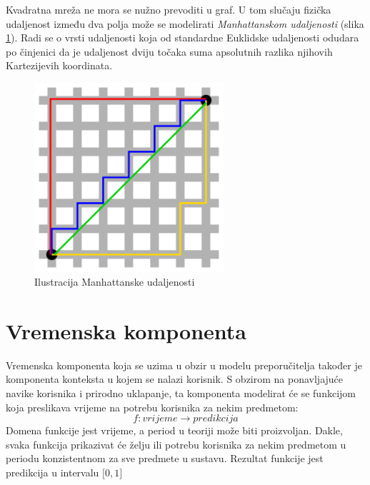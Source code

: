 \documentclass[times, utf8, diplomski, numeric]{fer}
\begin{document}
Kvadratna mreža ne mora se nužno prevoditi u graf. U tom slučaju fizička
udaljenost između dva polja može se modelirati \emph{Manhattanskom udaljenosti}
(slika \ref{fig:ManhattanDistance}). Radi se o vrsti udaljenosti koja od
standardne Euklidske udaljenosti odudara po činjenici da je udaljenost dviju
točaka suma apsolutnih razlika njihovih Kartezijevih koordinata.

 \begin{figure}[H]
	\centering
	\includegraphics[width=7cm]{images/Manhattan_distance.png}
	\caption{Ilustracija Manhattanske udaljenosti}
	\label{fig:ManhattanDistance}
\end{figure}

\section{Vremenska komponenta}
Vremenska komponenta koja se uzima u obzir u modelu preporučitelja također je
komponenta konteksta u kojem se nalazi korisnik. S obzirom na ponavljajuće
navike korisnika i prirodno uklapanje, ta komponenta modelirat će se funkcijom
koja preslikava vrijeme na potrebu korisnika za nekim predmetom:
\begin{equation}
	\label{eq:time}
	f: vrijeme \rightarrow predikcija
\end{equation}
Domena funkcije jest vrijeme, a period u teoriji može biti proizvoljan. Dakle,
svaka funkcija prikazivat će želju ili potrebu korisnika za nekim predmetom u
periodu konzistentnom za sve predmete u sustavu. Rezultat funkcije jest
predikcija u intervalu $\big[ 0, 1 \big]$
\end{document}
